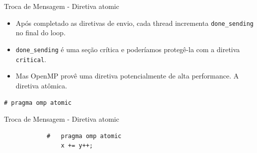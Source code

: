	\begin{frame}{Troca de Mensagem -  Diretiva atomic}
		\begin{itemize}
			\item Após completado as diretivas de envio, cada thread incrementa {\tt done\_sending} no final do loop.
			\item {\tt done\_sending} é uma seção crítica e poderíamos protegê-la com a diretiva {\tt critical}.
			\item Mas OpenMP provê uma diretiva potencialmente de alta performance. A diretiva atômica.
		\end{itemize}
		{\tt \#	pragma omp atomic}
	\end{frame}

	\begin{frame}[fragile]{Troca de Mensagem -  Diretiva atomic}

		\begin{verbatim}
			#	pragma omp atomic
				x += y++;
		\end{verbatim}
\end{frame}

